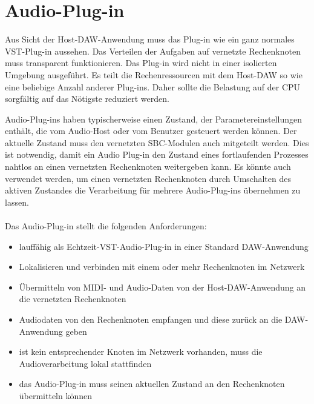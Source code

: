 \section{Audio-Plug-in}

Aus Sicht der Host-DAW-Anwendung muss das Plug-in wie ein ganz normales VST-Plug-in aussehen. Das Verteilen der Aufgaben auf vernetzte Rechenknoten muss transparent funktionieren. Das Plug-in wird nicht in einer isolierten Umgebung ausgeführt. Es teilt die Rechenressourcen mit dem Host-DAW so wie eine beliebige Anzahl anderer Plug-ins. Daher sollte die Belastung auf der CPU sorgfältig auf das Nötigste reduziert werden.

Audio-Plug-ins haben typischerweise einen Zustand, der Parametereinstellungen enthält, die vom Audio-Host oder vom Benutzer gesteuert werden können. Der aktuelle Zustand muss den vernetzten SBC-Modulen auch mitgeteilt werden. Dies ist notwendig, damit ein Audio Plug-in den Zustand eines fortlaufenden Prozesses nahtlos an einen vernetzten Rechenknoten weitergeben kann. Es könnte auch verwendet werden, um einen vernetzten Rechenknoten durch Umschalten des aktiven Zustandes die Verarbeitung für mehrere Audio-Plug-ins übernehmen zu lassen.\\
\\
\noindent
Das Audio-Plug-in stellt die folgenden Anforderungen:

\begin{itemize}

\item lauffähig als Echtzeit-VST-Audio-Plug-in in einer Standard DAW-Anwendung

\item Lokalisieren und verbinden mit einem oder mehr Rechenknoten im Netzwerk
\item Übermitteln von MIDI- und Audio-Daten von der Host-DAW-Anwendung an   die vernetzten Rechenknoten
\item Audiodaten von den Rechenknoten empfangen und  diese zurück an die  DAW-Anwendung geben
\item ist kein entsprechender Knoten im Netzwerk vorhanden, muss die Audioverarbeitung lokal stattfinden
\item das Audio-Plug-in muss seinen aktuellen Zustand an den Rechenknoten übermitteln können

\end{itemize}